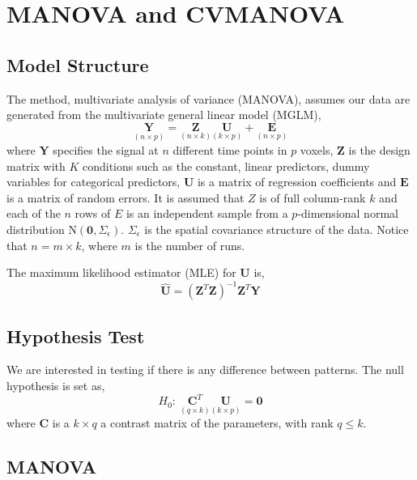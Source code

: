 \section{MANOVA and CVMANOVA}
\label{sec:manova}

\subsection{Model Structure}

The method, multivariate analysis of variance (MANOVA)\cite{fox2013hypothesis},
assumes our data are generated from the multivariate general linear
model (MGLM), 
\[
\underset{\left(n\times p\right)}{\boldsymbol{Y}}=\underset{\left(n\times k\right)}{\boldsymbol{Z}}\underset{\left(k\times p\right)}{\boldsymbol{U}}+\underset{\left(n\times p\right)}{\boldsymbol{E}}
\]
where $\boldsymbol{Y}$ specifies the signal at $n$ different time
points in $p$ voxels, $\boldsymbol{Z}$ is the design matrix with
$K$ conditions such as the constant, linear predictors, dummy variables
for categorical predictors, $\boldsymbol{U}$ is a matrix of regression
coefficients and $\boldsymbol{E}$ is a matrix of random errors. It
is assumed that $Z$ is of full column-rank $k$ and each of the $n$
rows of $E$ is an independent sample from a $p$-dimensional normal
distribution $\text{N}(\boldsymbol{0},\Sigma_{\epsilon})$. $\Sigma_{\epsilon}$
is the spatial covariance structure of the data. Notice that $n=m\times k$,
where $m$ is the number of runs.

The maximum likelihood estimator (MLE) for $\boldsymbol{U}$ is, 
\[
\hat{\boldsymbol{U}}=\left(\boldsymbol{Z}^{T}\boldsymbol{Z}\right)^{-1}\boldsymbol{Z}^{T}\boldsymbol{Y}
\]



\subsection{Hypothesis Test}

We are interested in testing if there is any difference between patterns.
The null hypothesis is set as, 
\[
H_{0}:\ \underset{\left(q\times k\right)}{\boldsymbol{C}^{T}}\underset{\left(k\times p\right)}{\boldsymbol{U}}=\boldsymbol{0}
\]
where $\boldsymbol{C}$ is a $k\times q$ a contrast matrix of the
parameters, with rank $q\le k$.


\subsection{MANOVA\label{sub:MANOVA}}

